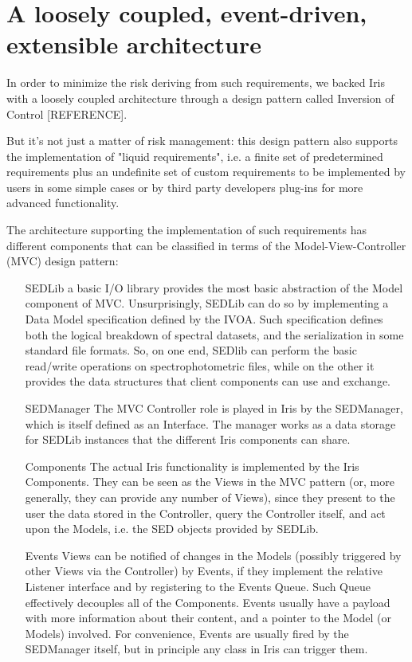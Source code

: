 \section{A loosely coupled, event-driven, extensible architecture}
\label{sec:architecture}

In order to minimize the risk deriving from such requirements, we backed Iris with a loosely coupled architecture through a design pattern called Inversion of Control [REFERENCE].

But it's not just a matter of risk management: this design pattern also supports the implementation of "liquid requirements", i.e. a finite set of predetermined requirements plus an undefinite set of custom requirements to be implemented by users in some simple cases or by third party developers plug-ins for more advanced functionality.

The architecture supporting the implementation of such requirements has different components that can be classified in terms of the Model-View-Controller (MVC) design pattern:
\begin{itemize}
\item[SEDLib] a basic I/O library provides the most basic abstraction of the Model component of MVC. Unsurprisingly, SEDLib can do so by implementing a Data Model specification defined by the IVOA. Such specification defines both the logical breakdown of spectral datasets, and the serialization in some standard file formats. So, on one end, SEDlib can perform the basic read/write operations on spectrophotometric files, while on the other it provides the data structures that client components can use and exchange.
\item[SEDManager] The MVC Controller role is played in Iris by the SEDManager, which is itself defined as an Interface. The manager works as a data storage for SEDLib instances that the different Iris components can share.
\item[Components] The actual Iris functionality is implemented by the Iris Components. They can be seen as the Views in the MVC pattern (or, more generally, they can provide any number of Views), since they present to the user the data stored in the Controller, query the Controller itself, and act upon the Models, i.e. the SED objects provided by SEDLib.
\item[Events] Views can be notified of changes in the Models (possibly triggered by other Views via the Controller) by Events, if they implement the relative Listener interface and by registering to the Events Queue. Such Queue effectively decouples all of the Components. Events usually have a payload with more information about their content, and a pointer to the Model (or Models) involved. For convenience, Events are usually fired by the SEDManager itself, but in principle any class in Iris can trigger them.
\end{itemize}

